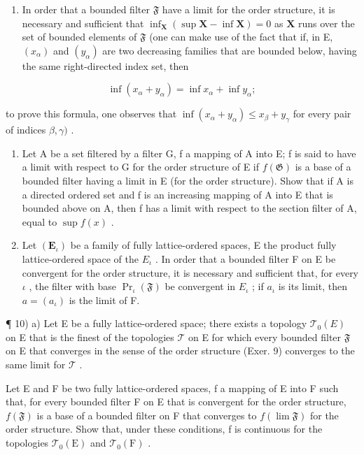 \begin{enumerate}
\def\labelenumi{\alph{enumi})}
\tightlist
\item
  In order that a bounded filter \(\mathfrak{F}\) have a limit for the order structure, it is necessary and sufficient that \(\inf_{\mathbf{X}} (\sup \mathbf{X} - \inf \mathbf{X}) = 0\) as \(\mathbf{X}\) runs over the set of bounded elements of \(\mathfrak{F}\) (one can make use of the fact that if, in E, \((x_{\alpha})\) and \((y_{\alpha})\) are two decreasing families that are bounded below, having the same right-directed index set, then
\end{enumerate}

\[
\inf (x _ {\alpha} + y _ {\alpha}) = \inf x _ {\alpha} + \inf y _ {\alpha};
\]

to prove this formula, one observes that \(\inf (x_{\alpha} + y_{\alpha})\leqslant x_{\beta} + y_{\gamma}\) for every pair of indices \(\beta ,\gamma)\) .

\begin{enumerate}
\def\labelenumi{\alph{enumi})}
\setcounter{enumi}{1}
\item
  Let A be a set filtered by a filter G, f a mapping of A into E; f is said to have a limit with respect to G for the order structure of E if \(f(\mathfrak{G})\) is a base of a bounded filter having a limit in E (for the order structure). Show that if A is a directed ordered set and f is an increasing mapping of A into E that is bounded above on A, then f has a limit with respect to the section filter of A, equal to \(\sup f(x)\) .
\item
  Let \((\mathbf{E}_{\iota})\) be a family of fully lattice-ordered spaces, E the product fully lattice-ordered space of the \(E_{\iota}\) . In order that a bounded filter F on E be convergent for the order structure, it is necessary and sufficient that, for every \(\iota\) , the filter with base \(\Pr_{\iota}(\mathfrak{F})\) be convergent in \(E_{\iota}\) ; if \(a_{\iota}\) is its limit, then \(a = (a_{\iota})\) is the limit of F.
\end{enumerate}

¶ 10) a) Let E be a fully lattice-ordered space; there exists a topology \(\mathcal{T}_0(E)\) on E that is the finest of the topologies \(\mathcal{T}\) on E for which every bounded filter \(\mathfrak{F}\) on E that converges in the sense of the order structure (Exer. 9) converges to the same limit for \(\mathcal{T}\) .

Let E and F be two fully lattice-ordered spaces, f a mapping of E into F such that, for every bounded filter F on E that is convergent for the order structure, \(f(\mathfrak{F})\) is a base of a bounded filter on F that converges to \(f(\lim \mathfrak{F})\) for the order structure. Show that, under these conditions, f is continuous for the topologies \(\mathcal{T}_{0}(\mathrm{E})\) and \(\mathcal{T}_{0}(\mathrm{F})\) .

